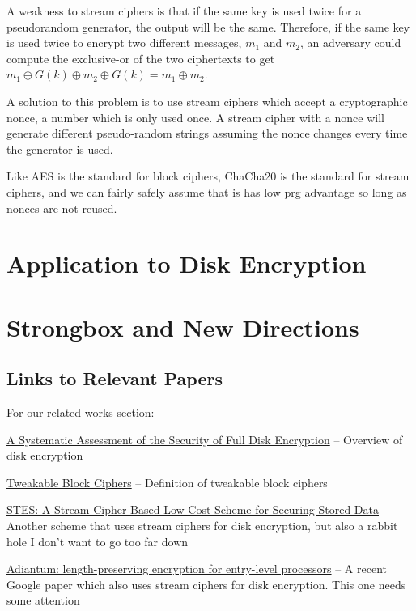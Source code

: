 \documentclass[11pt]{article}
\newcommand{\xor}{\oplus}
\begin{document}
	A weakness to stream ciphers is that if the same key is used twice for a pseudorandom generator, the output will be the same. Therefore, if the same key is used twice to encrypt two different messages, $m_1$ and $m_2$, an adversary could compute the exclusive-or of the two ciphertexts to get $m_1 \xor G(k) \xor m_2 \xor G(k) = m_1 \xor m_2$.
	
	A solution to this problem is to use stream ciphers which accept a cryptographic nonce, a number which is only used once. A stream cipher with a nonce will generate different pseudo-random strings assuming the nonce changes every time the generator is used.
	
	Like AES is the standard for block ciphers, ChaCha20 is the standard for stream ciphers, and we can fairly safely assume that is has low prg advantage so long as nonces are not reused.  
	
	\section{Application to Disk Encryption}

	\section{Strongbox and New Directions}
	
	\subsection{Links to Relevant Papers}
	
	For our related works section:
	
	\begin{description}[font=$\bullet$~\normalfont\scshape\color{red!50!black}]
		\item \href{https://ieeexplore.ieee.org/abstract/document/6951337}{A Systematic Assessment of the Security of Full Disk Encryption} -- Overview of disk encryption
		\item \href{https://people.eecs.berkeley.edu/~daw/papers/tweak-joc.pdf}{Tweakable Block Ciphers} -- Definition of tweakable block ciphers
		\item \href{https://ieeexplore.ieee.org/abstract/document/6945842}{STES: A Stream Cipher Based Low Cost Scheme for Securing Stored Data} -- Another scheme that uses stream ciphers for disk encryption, but also a rabbit hole I don't want to go too far down
		\item \href{https://eprint.iacr.org/2018/720}{Adiantum: length-preserving encryption for
			entry-level processors} -- A recent Google paper which also uses stream ciphers for disk encryption. This one needs some attention
		\item \href{}{}
	\end{description}
	
	
	
\end{document}

